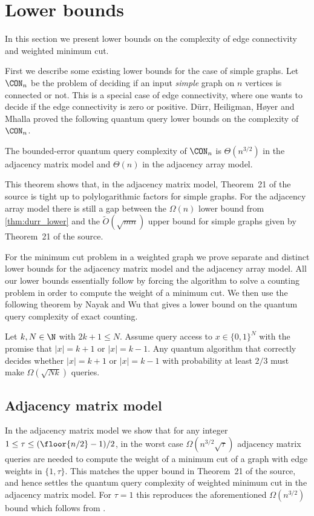 \setcounter{section}{4}
\setcounter{theorem}{32}
\section{Lower bounds} \label{sec:lower-bounds}
In this section we present lower bounds on the complexity of edge connectivity and weighted minimum cut.

First we describe some existing lower bounds for the case of simple graphs.
Let $\CON_n$ be the problem of deciding if an input \emph{simple} graph on $n$ vertices is connected or not.  This is a special case of edge connectivity, where one wants 
to decide if the edge connectivity is zero or positive.  D\"{u}rr, Heiligman, H{\o}yer and Mhalla \cite{DHHM06} proved the following quantum query lower bounds on the complexity of $\CON_n$.
\begin{theorem}
\label{thm:durr_lower}
The bounded-error quantum query complexity of $\CON_n$ is $\Theta(n^{3/2})$ in the adjacency matrix model and 
$\Theta(n)$ in the adjacency array model.  
\end{theorem}
\noindent
This theorem shows that, in the adjacency matrix model, Theorem~21 of the source is tight up to polylogarithmic factors for simple graphs.  For the adjacency array model 
there is still a gap between the $\Omega(n)$ lower bound from \cref{thm:durr_lower} and the $\tilde O(\sqrt{mn})$ upper bound for simple graphs given by Theorem~21 of the source.

For the minimum cut problem in a weighted graph we prove separate and distinct lower bounds for the adjacency matrix model and the adjacency array model.
All our lower bounds essentially follow by forcing the algorithm to solve a counting problem in order to compute the weight of a minimum cut.
We then use the following theorem by Nayak and Wu that gives a lower bound on the quantum query complexity of exact counting.

\begin{theorem}[{\cite[Corollary 1.2]{NW99}}]
\label{thm:thresh}
Let $k,N \in \N$ with $2k+1 \le N$.  Assume query access to $x \in \{0,1\}^N$ with the promise that $|x| = k+1$ or $|x| = k-1$.  Any quantum algorithm that correctly decides whether $|x| = k+1$ or $|x| = k-1$ with probability at least $2/3$ must make $\Omega(\sqrt{N k})$ queries.
\end{theorem}

\subsection{Adjacency matrix model}

In the adjacency matrix model we show that for any integer $1 \le \tau \le (\floor{n/2}-1)/2$, in the worst case $\Omega( n^{3/2} \sqrt{\tau})$ adjacency matrix queries are needed to compute the weight of a minimum cut of a graph with edge weights in 
$\{1,\tau\}$.
This matches the upper bound in Theorem~21 of the source, and hence settles the quantum query complexity of weighted minimum cut in the adjacency matrix model.
For $\tau = 1$ this reproduces the aforementioned $\Omega(n^{3/2})$ bound which follows from \cite{DHHM06}.


